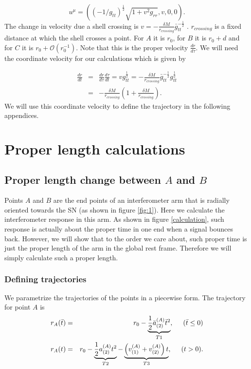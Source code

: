 \documentclass[aps,showpacs,onecolumn,floats,prd,superscriptaddress,nofootinbib]{revtex4-1}
\begin{document}
\begin{equation}
	u^\mu = \left( (-1/g_{tt})^\frac{1}{2} \sqrt{1+v^2g_{rr} }, v , 0, 0 \right).	\label{5}
\end{equation}
The change in velocity due a shell crossing is $v = -\frac{\delta M}{r_{crossing}} \bar{g}_{tt}^{-\frac{1}{2}} $ . $r_{crossing}$ is a fixed distance at which the shell crosses a point. For $A$ it is $r_0$, for $B$ it is $r_0 + d$ and for $C$ it is $r_0 + \mathcal{O}(r_0^{-1})$. Note that this is the proper velocity $\frac{dr}{d\tau}$. We will need the coordinate velocity for our calculations which is given by 

\begin{eqnarray}
	\frac{dr}{dt} &=& \frac{dr}{d \tau} \frac{d \tau}{dt} = v g_{tt}^{\frac{1}{2}} = - \frac{\delta M}{r_{crossing}} \bar{g}_{tt}^{-\frac{1}{2}} g_{tt}^\frac{1}{2} \nonumber \\
	&=& -\frac{\delta M}{r_{crossing}} \left( 1 + \frac{\delta M}{r_{crossing}} \right).
\end{eqnarray}
We will use this coordinate velocity to define the trajectory in the following appendices. 

\newpage
\section{Proper length calculations}
\subsection{Proper length change between $A$ and $B$}
\label{sec-LAB}

Points $A$ and $B$ are the end points of an interferometer arm that is radially oriented towards the SN (as shown in figure \ref{fig:1}). 
Here we calculate the interferometer response in this arm.
As shown in figure \ref{calculation}, such response is actually about the proper time in one end when a signal bounces back.
However, we will show that to the order we care about, such proper time is just the proper length of the arm in the global rest frame.
Therefore we will simply calculate such a proper length.

\subsubsection{Defining trajectories}

We parametrize the trajectories of the points in a piecewise form. 
The trajectory for point $A$ is
\begin{eqnarray}
	r_A(\bar{t}) & = & r_0 - \underbrace{\frac{1}{2} \bar{a}_{(2)}^{(A)} \bar{t}^2}_{T1}, \hspace{5mm} (\bar{t} \leq 0)	\nonumber	\\
	r_A(t) & = & r_0 - \underbrace{\frac{1}{2} a^{(A)}_{(2)} t^2}_{T2} - \underbrace{\left(v^{(A)}_{(1)} + v^{(A)}_{(2)} \right)t}_{T3},  \hspace{5mm} (t>0)  \label{rA}.
\end{eqnarray}
\end{document}
